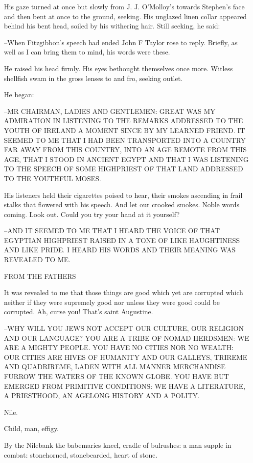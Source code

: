 His gaze turned at once but slowly from J. J. O'Molloy's towards
Stephen's face and then bent at once to the ground, seeking. His unglazed
linen collar appeared behind his bent head, soiled by his withering hair.
Still seeking, he said:

--When Fitzgibbon's speech had ended John F Taylor rose to reply.
Briefly, as well as I can bring them to mind, his words were these.

He raised his head firmly. His eyes bethought themselves once more.
Witless shellfish swam in the gross lenses to and fro, seeking outlet.

He began:

--MR CHAIRMAN, LADIES AND GENTLEMEN: GREAT WAS MY ADMIRATION IN LISTENING
TO THE REMARKS ADDRESSED TO THE YOUTH OF IRELAND A MOMENT SINCE BY MY
LEARNED FRIEND. IT SEEMED TO ME THAT I HAD BEEN TRANSPORTED INTO A COUNTRY
FAR AWAY FROM THIS COUNTRY, INTO AN AGE REMOTE FROM THIS AGE, THAT I STOOD
IN ANCIENT EGYPT AND THAT I WAS LISTENING TO THE SPEECH OF SOME HIGHPRIEST
OF THAT LAND ADDRESSED TO THE YOUTHFUL MOSES.

His listeners held their cigarettes poised to hear, their smokes
ascending in frail stalks that flowered with his speech. And let our
crooked smokes. Noble words coming. Look out. Could you try your hand at
it yourself?

--AND IT SEEMED TO ME THAT I HEARD THE VOICE OF THAT EGYPTIAN HIGHPRIEST
RAISED IN A TONE OF LIKE HAUGHTINESS AND LIKE PRIDE. I HEARD HIS WORDS AND
THEIR MEANING WAS REVEALED TO ME.


    FROM THE FATHERS


It was revealed to me that those things are good which yet are
corrupted which neither if they were supremely good nor unless they were
good could be corrupted. Ah, curse you! That's saint Augustine.

--WHY WILL YOU JEWS NOT ACCEPT OUR CULTURE, OUR RELIGION AND OUR
LANGUAGE? YOU ARE A TRIBE OF NOMAD HERDSMEN: WE ARE A MIGHTY PEOPLE. YOU
HAVE NO CITIES NOR NO WEALTH: OUR CITIES ARE HIVES OF HUMANITY AND OUR
GALLEYS, TRIREME AND  QUADRIREME, LADEN WITH ALL MANNER MERCHANDISE FURROW
THE WATERS OF THE KNOWN GLOBE. YOU HAVE BUT EMERGED FROM PRIMITIVE
CONDITIONS: WE HAVE A LITERATURE, A PRIESTHOOD, AN AGELONG HISTORY AND A
POLITY.

Nile.

Child, man, effigy.

By the Nilebank the babemaries kneel, cradle of bulrushes: a man
supple in combat: stonehorned, stonebearded, heart of stone.

